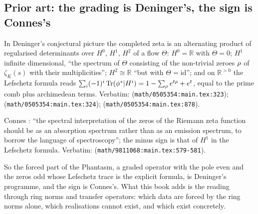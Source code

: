 \subsection{Prior art: the grading is Deninger's, the sign is Connes's}

\begin{citedfact}
\label{cit:deninger-graded-lefschetz}
In Deninger's conjectural picture \cite{deninger2005foliated} the completed zeta is an
alternating product of regularised determinants over $H^0$, $H^1$, $H^2$ of a flow
$\Theta$: $H^0 = \mathbb R$ with $\Theta = 0$; $H^1$ infinite dimensional, ``the spectrum
of $\Theta$ consisting of the non-trivial zeroes $\rho$ of $\zeta_K(s)$ with their
multiplicities''; $H^2\cong\mathbb R$ ``but with $\Theta = \mathrm{id}$''; and on
$\mathbb R^{>0}$ the Lefschetz formula reads $\sum_i(-1)^i\operatorname{Tr}(\phi^*|H^i) = 1 - \sum_\rho
e^{t\rho} + e^t$, equal to the prime comb plus archimedean terms.
Verbatim: \texttt{} (\texttt{math/0505354:main.tex:323}); \texttt{} (\texttt{math/0505354:main.tex:324}); \texttt{} (\texttt{math/0505354:main.tex:878}).
\end{citedfact}

\begin{citedfact}
\label{cit:connes-absorption}
Connes \cite{connes1998trace}: ``the spectral interpretation of the zeros of the Riemann
zeta function should be as an absorption spectrum rather than as an emission spectrum,
to borrow the language of spectroscopy''; the minus sign is that of $H^1$ in the
Lefschetz formula.
Verbatim: \texttt{} (\texttt{math/9811068:main.tex:579-581}).
\end{citedfact}

So the forced part of the Phantasm, a graded operator with the pole even and the zeros
odd whose Lefschetz trace is the explicit formula, is Deninger's programme, and the sign
is Connes's. What this book adds is the reading through ring norms and transfer
operators: which data are forced by the ring norms alone, which realisations cannot
exist, and which exist concretely.

